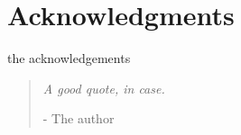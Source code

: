 \chapter*{Acknowledgments}

the acknowledgements

\blockquote{
\emph{A good quote, in case.}
\begin{flushright}
- The author
\end{flushright}
}%
